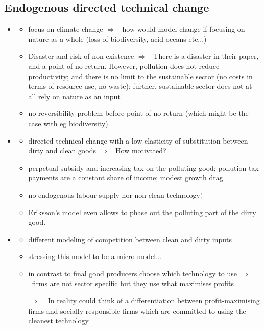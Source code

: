 \documentclass[12pt]{article}
\newcommand{\ar}{$\Rightarrow$ \ }
\begin{document}
\subsection{Endogenous directed technical change}
\begin{itemize}
	\item \cite{Acemoglu2012TheChange}
	\begin{itemize}
		\item focus on climate change \ar how would model change if focusing on nature as a whole (loss of biodiversity, acid oceans etc...)
\item 	Disaster and risk of non-existence \ar There is a disaster in their paper, and a point of no return. However, pollution does not reduce productivity; and there is no limit to the sustainable sector (no costs in terms of resource use, no waste); further, sustainable sector does not at all rely on nature as an input
\item no reversibility problem before point of no return (which might be the case with eg biodiversity)
	\end{itemize}	
	\item \cite{Eriksson2018PhasingChange}
	\begin{itemize}
\item directed technical change with  a low elasticity of substitution between dirty and clean goods \ar How motivated?
\item perpetual subsidy and increasing tax on the polluting good; pollution tax payments are a constant share of income; modest growth drag
\item no endogenous labour supply nor non-clean technology!
\item Eriksson's model even allows to phase out the polluting part of the dirty good. 
	\end{itemize}
\item \cite{Acemoglu2016TransitionTechnology}
\begin{itemize}
	\item different modeling of competition between clean and dirty inputs
	\item stressing this model to be a micro model...
	\item in contrast to \cite{Acemoglu2012TheChange} final good producers choose which technology to use \ar firms are not sector specific but they use what maximises profits 
	\item[\ar] In reality could think of a differentiation between profit-maximising firms and socially responsible firms which are committed to using the cleanest technology

\end{itemize}
\end{itemize}
\end{document}
